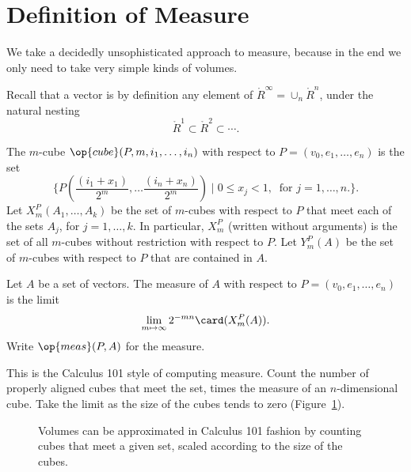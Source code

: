 

\def\aspan#1{{\langle #1\rangle}}
\def\vc{\op{vc}} %

\section{Definition of Measure}

We take a decidedly unsophisticated approach to measure, because in
the end we only need to take very simple kinds of volumes.

Recall that a vector is by definition any element of
$\ring{R}^\infty = \cup_n \ring{R}^n$, under the natural nesting
    $$\ring{R}^1 \subset \ring{R}^2 \subset \cdots.$$


\begin{definition}
    The $m$-cube  $\op{cube}(P,m,i_1,\ldots,i_n)$
    with respect to $P=(v_0,e_1,\ldots,e_n)$ is the
    set
        $$\{P(\frac{(i_1+x_1)}{2^m},\ldots\frac{(i_n+x_n)}{2^m}) \mid 0 \le
        x_j
        < 1,\ \text{ for } j=1,\ldots,n.\}.$$
Let $X^P_m(A_1,\ldots,A_k)$ be the set of $m$-cubes with respect to
$P$ that meet each of the sets $A_j$, for $j=1,\ldots,k$.  In
particular, $X^P_m$ (written without arguments) is the set of all
$m$-cubes without restriction with respect to $P$. Let $Y^P_m(A)$ be
the set of $m$-cubes with respect to $P$ that are contained in $A$.
\end{definition}

\begin{definition}
    Let $A$ be a set of vectors.  The measure of $A$ with respect to
        $P=(v_0,e_1,\ldots,e_n)$ is the limit
    \begin{equation}\label{eqn:measure}
    \lim_{m\mapsto\infty} 2^{-m n}\card(X^P_m(A)).
    \end{equation}
    Write $\op{meas} (P,A)$ for the measure.
\end{definition}

This is the Calculus 101 style of computing measure.  Count the
number of properly aligned cubes that meet the set, times the
measure of an $n$-dimensional cube.  Take the limit as the size of
the cubes tends to zero  (Figure~\ref{fig:cubes}).

\begin{figure}[htb]
  \centering
  \caption{Volumes can be approximated in Calculus
  101 fashion by counting cubes
   that meet a given set, scaled according to the size of the cubes.}
  \label{fig:cubes}
\end{figure}




